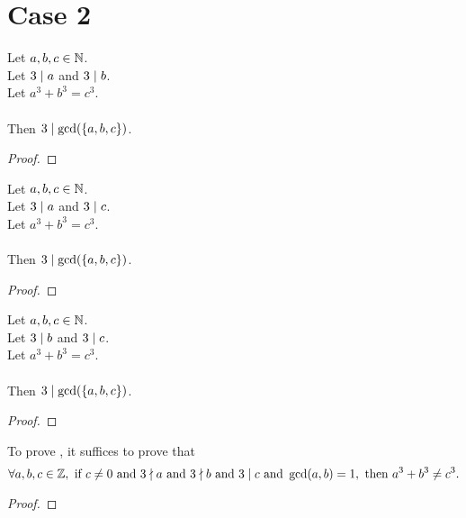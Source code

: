 \chapter*{Case 2}

\begin{lemma}
    \label{lmm:three_dvd_gcd_of_dvd_a_of_dvd_b}
    \leanok
    Let $a, b, c \in \mathbb{N}$. \\
    Let $3 \mid a$ and $3 \mid b$. \\
    Let $a ^ 3 + b ^ 3 = c ^ 3$. \\\\
    Then $3 \mid \gcd(\left\{a, b, c\right\})$.
\end{lemma}
\begin{proof}
    \leanok
\end{proof}

\begin{lemma}
    \label{lmm:three_dvd_gcd_of_dvd_a_of_dvd_c}
    \leanok
    Let $a, b, c \in \mathbb{N}$. \\
    Let $3 \mid a$ and $3 \mid c$. \\
    Let $a ^ 3 + b ^ 3 = c ^ 3$. \\\\
    Then $3 \mid \gcd(\left\{a, b, c\right\})$.
\end{lemma}
\begin{proof}
    \leanok
\end{proof}

\begin{lemma}
    \label{lmm:three_dvd_gcd_of_dvd_b_of_dvd_c}
    \leanok
    Let $a, b, c \in \mathbb{N}$. \\
    Let $3 \mid b$ and $3 \mid c$. \\
    Let $a ^ 3 + b ^ 3 = c ^ 3$. \\\\
    Then $3 \mid \gcd(\left\{a, b, c\right\})$.
\end{lemma}
\begin{proof}
    \leanok
\end{proof}

\begin{theorem}
    \label{thm:fermatLastTheoremThree_of_three_dvd_only_c}
    \leanok
    To prove , it suffices to prove that
    $$\forall a, b, c \in \mathbb{Z}, \text{ if } c \neq 0 \text{ and } 3 \nmid a \text{ and }
    3 \nmid b \text{ and } 3 \mid c \text{ and } \gcd(a,b)=1,
    \text{ then } a^3 + b^3 \neq c^3.$$
\end{theorem}
\begin{proof}
    \leanok
\end{proof}

